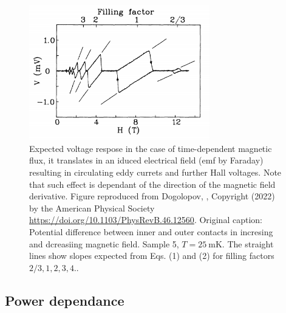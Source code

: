 \begin{figure}
    \includegraphics[width=0.7\textwidth]{figures/experimental/dolgopolov_01.png}
    \caption{Expected voltage respose in the case of time-dependent magnetic flux, it translates in an iduced electrical field (emf by Faraday) resulting in circulating eddy currets and further Hall voltages. Note that such effect is dependant of the direction of the magnetic field derivative. Figure reproduced from Dogolopov, \etal \cite{dolgopolov1992quantum}, Copyright (2022) by the American Physical Society \url{https://doi.org/10.1103/PhysRevB.46.12560}. Original caption: Potential difference between inner and outer contacts in incresing and dcreasiing magnetic field. Sample 5, \( T = \SI{25}{\milli\kelvin}\). The straight lines show slopes expected from Eqs. (1) and (2) for filling factors \( 2/3, 1, 2, 3, 4.\).  }
    \label{fig:dolgo}
\end{figure}



\subsection{Power dependance}
\label{subsec:powerDependance}

